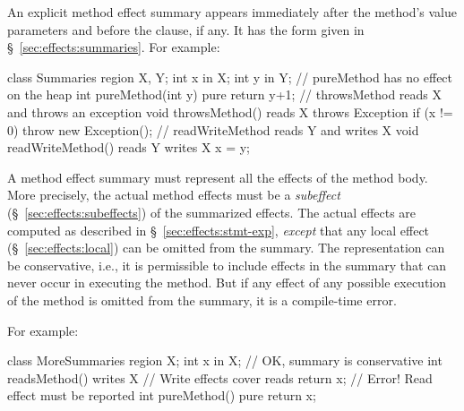  An explicit method effect
summary appears immediately after the method's value parameters and
before the  clause, if any.  It has the form given in
\S~\ref{sec:effects:summaries}.  For example:
%
\begin{dpjlisting}
class Summaries {
  region X, Y;
  int x in X;
  int y in Y;
  // pureMethod has no effect on the heap
  int pureMethod(int y) pure { return y+1; }
  // throwsMethod reads X and throws an exception
  void throwsMethod() reads X throws Exception {
    if (x != 0) throw new Exception();
  }
  // readWriteMethod reads Y and writes X
  void readWriteMethod() reads Y writes X {
    x = y;
  }
}
\end{dpjlisting}
%

A method effect summary must represent all the effects of the method
body.  More precisely, the actual method effects must be a
\emph{subeffect} (\S~\ref{sec:effects:subeffects}) of the summarized
effects.  The actual effects are computed as described in
\S~\ref{sec:effects:stmt-exp}, \emph{except} that any local effect
(\S~\ref{sec:effects:local}) can be omitted from the summary.  The
representation can be conservative, i.e., it is permissible to include
effects in the summary that can never occur in executing the method.
But if any effect of any possible execution of the method is omitted
from the summary, it is a compile-time error.  

For example:
%
\begin{dpjlisting}
class MoreSummaries {
  region X;
  int x in X;
  // OK, summary is conservative
  int readsMethod() writes X {
    // Write effects cover reads
    return x;
  }
  // Error!  Read effect must be reported
  int pureMethod() pure {
    return x;
  }
}
\end{dpjlisting}
%

